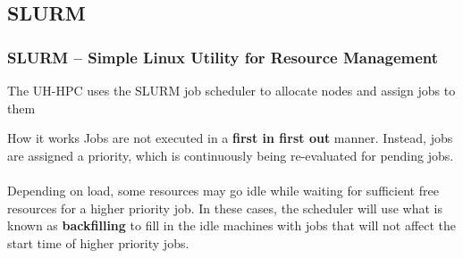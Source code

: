 \subsection{SLURM}
\begin{frame}
  \frametitle{SLURM -- \textbf{S}imple \textbf{L}inux \textbf{U}tility for \textbf{R}esource \textbf{M}anagement }
  The UH-HPC uses the SLURM job scheduler to allocate nodes and assign jobs to them
  
  \begin{block}{How it works}
    Jobs are not executed in a \textbf{first in first out} manner.  Instead, jobs are assigned a priority, which is continuously being re-evaluated for pending jobs.
    \\~\\Depending on load, some resources may go idle while waiting for sufficient free resources for a higher priority job.
    In these cases, the scheduler will use what is known as \textbf{backfilling} to fill in the idle machines with jobs that will not affect the start time of higher priority jobs.
	\end{block}
    
       
\end{frame}




